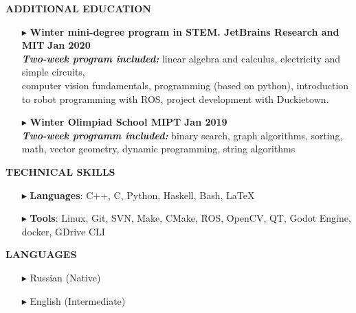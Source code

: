 \documentclass[a4paper,10pt]{article}
\begin{document}
	\colorbox{magicmint}{
		\begin{minipage}{0.96\textwidth}
			\vphantom{.}
			\textbf{ADDITIONAL EDUCATION}
		\end{minipage}
	}
	
	\begin{itemize}
		\item[$\blacktriangleright$]  \textbf{Winter mini-degree program in STEM. JetBrains Research and MIT} \hspace{4.4cm}\textbf{Jan 2020} \\ 
		\textit{\textbf{Two-week program included:}} linear algebra and calculus, electricity and simple circuits,\\ computer vision fundamentals, programming (based on python), introduction to robot programming with ROS, project development with Duckietown.
		\item[$\blacktriangleright$]  \textbf{Winter Olimpiad School MIPT} \hspace{10.4cm}\textbf{Jan 2019} \\ \textit{\textbf{Two-week programm included:}} binary search, graph algorithms, sorting, math, vector geometry, dynamic programming, string algorithms
	\end{itemize}
	
	
	
	\colorbox{magicmint}{
		\begin{minipage}{0.96\textwidth}
			\vphantom{.}
			\textbf{TECHNICAL SKILLS}
		\end{minipage}
	}
	\begin{itemize}
		\item [$\blacktriangleright$]  \textbf{Languages}: C++, C, Python, Haskell, Bash, \LaTeX
		\item [$\blacktriangleright$]  \textbf{Tools}: Linux, Git, SVN, Make, CMake, ROS, OpenCV, QT, Godot Engine, docker, GDrive CLI
	\end{itemize}
	 
	
	\colorbox{magicmint}{
		\begin{minipage}{0.96\textwidth}
			\vphantom{.}
			\textbf{LANGUAGES}
		\end{minipage}
	}
	\begin{itemize}
		\item[$\blacktriangleright$]  Russian (Native)
		\item[$\blacktriangleright$]  English (Intermediate)
	\end{itemize}
	
\end{document}
